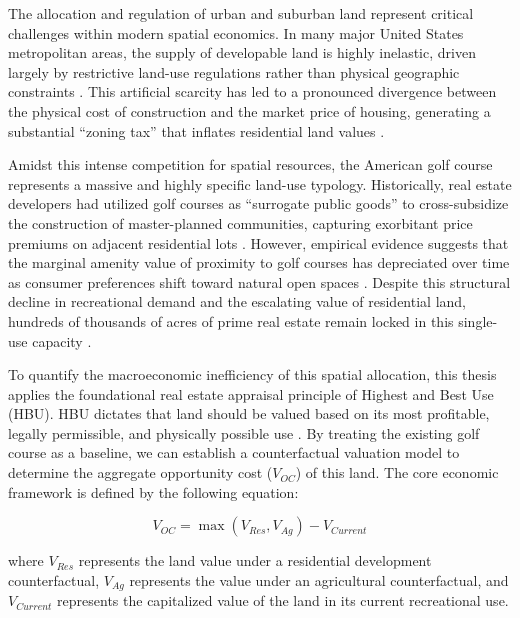 \documentclass[10pt, letterpaper]{article}
\begin{document}
The allocation and regulation of urban and suburban land represent critical challenges within modern spatial economics. In many major United States metropolitan areas, the supply of developable land is highly inelastic, driven largely by restrictive land-use regulations rather than physical geographic constraints \parencite{Glaeser2017, Gyourko2021}. This artificial scarcity has led to a pronounced divergence between the physical cost of construction and the market price of housing, generating a substantial ``zoning tax'' that inflates residential land values \parencite{Glaeser2005, Davis2021}. 

Amidst this intense competition for spatial resources, the American golf course represents a massive and highly specific land-use typology. Historically, real estate developers had utilized golf courses as ``surrogate public goods'' to cross-subsidize the construction of master-planned communities, capturing exorbitant price premiums on adjacent residential lots \parencite{Limehouse2012}. However, empirical evidence suggests that the marginal amenity value of proximity to golf courses has depreciated over time as consumer preferences shift toward natural open spaces \parencite{Cho2009}. Despite this structural decline in recreational demand and the escalating value of residential land, hundreds of thousands of acres of prime real estate remain locked in this single-use capacity \parencite{Weinand2025}.

To quantify the macroeconomic inefficiency of this spatial allocation, this thesis applies the foundational real estate appraisal principle of Highest and Best Use (HBU). HBU dictates that land should be valued based on its most profitable, legally permissible, and physically possible use \parencite{AppraisalInstitute2020}. By treating the existing golf course as a baseline, we can establish a counterfactual valuation model to determine the aggregate opportunity cost ($V_{OC}$) of this land. The core economic framework is defined by the following equation:

\begin{equation}
    V_{OC} = \max(V_{Res}, V_{Ag}) - V_{Current}
\end{equation}

where $V_{Res}$ represents the land value under a residential development counterfactual, $V_{Ag}$ represents the value under an agricultural counterfactual, and $V_{Current}$ represents the capitalized value of the land in its current recreational use. 
\end{document}
